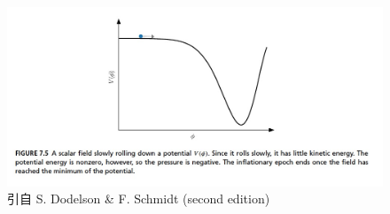 \documentclass[12pt]{ctexart}
\begin{document}
\begin{figure}[!hbtp]
	\centering
	\includegraphics[width=1.0\linewidth]{slow-roll.jpg}
	\caption{引自 S. Dodelson \& F. Schmidt (second edition)} \label{slow-roll}
\end{figure}
\end{document}
